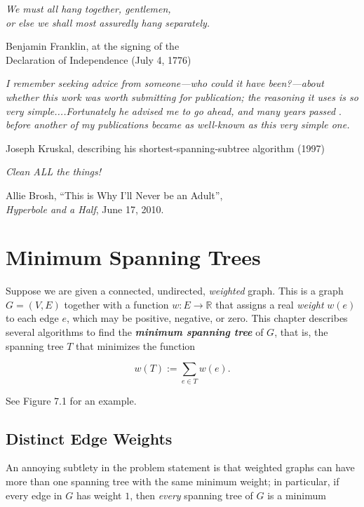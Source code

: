\epigraph{\textit{We must all hang together, gentlemen,}\\\textit{or else we shall most assuredly hang separately.}}{Benjamin Franklin, at the signing of the\\Declaration of Independence (July 4, 1776)}

\epigraph{\textit{I remember seeking advice from someone—who could it have been?—about}\\\textit{whether this work was worth submitting for publication; the reasoning it uses is so}\\\textit{very simple....Fortunately he advised me to go ahead, and many years passed} .\\\textit{before another of my publications became as well-known as this very simple one.}}{Joseph Kruskal, describing his shortest-spanning-subtree algorithm (1997)}

\epigraph{\textit{Clean ALL the things!}}{Allie Brosh, “This is Why I’ll Never be an Adult”,\\\textit{Hyperbole and a Half}, June 17, 2010.}

\chapter{Minimum Spanning Trees}
\label{ch:7}

Suppose we are given a connected, undirected, \textit{weighted} graph. This is a graph $G = (V, E)$ together with a function $w:E \to \mathbb{R}$  that assigns a real \textit{weight} $w(e)$ to each edge $e$, which may be positive, negative, or zero. This chapter describes several algorithms to find the \textbf{\textit{minimum spanning tree}} of $G$, that is, the spanning tree $T$ that minimizes the function

\[
w(T) := \sum_{e \in T} w(e).
\]

See Figure 7.1 for an example.

\section{Distinct Edge Weights}
\label{sec:7.1}

An annoying subtlety in the problem statement is that weighted graphs can have more than one spanning tree with the same minimum weight; in particular, if every edge in $G$ has weight $1$, then \textit{every} spanning tree of $G$ is a minimum

